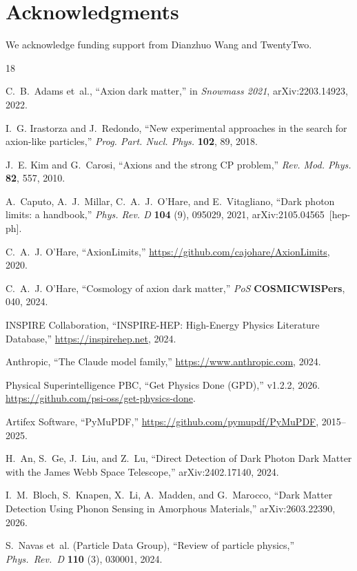 \documentclass{article}
\begin{document}
\section*{Acknowledgments}

We acknowledge funding support from Dianzhuo Wang and TwentyTwo.




\begin{thebibliography}{18}

C.~B.~Adams et~al.,
``Axion dark matter,''
in \textit{Snowmass 2021}, arXiv:2203.14923, 2022.

I.~G. Irastorza and J.~Redondo,
``New experimental approaches in the search for axion-like particles,''
\textit{Prog. Part. Nucl. Phys.} \textbf{102}, 89, 2018.

J.~E. Kim and G.~Carosi,
``Axions and the strong CP problem,''
\textit{Rev. Mod. Phys.} \textbf{82}, 557, 2010.

A.~Caputo, A.~J.~Millar, C.~A.~J.~O'Hare, and E.~Vitagliano,
``Dark photon limits: a handbook,''
\textit{Phys. Rev. D} \textbf{104} (9), 095029, 2021,
arXiv:2105.04565~[hep-ph].

C.~A.~J. O'Hare,
``AxionLimits,''
\url{https://github.com/cajohare/AxionLimits}, 2020.

C.~A.~J. O'Hare,
``Cosmology of axion dark matter,''
\textit{PoS} \textbf{COSMICWISPers}, 040, 2024.

INSPIRE Collaboration,
``INSPIRE-HEP: High-Energy Physics Literature Database,''
\url{https://inspirehep.net}, 2024.

Anthropic,
``The Claude model family,''
\url{https://www.anthropic.com}, 2024.

Physical Superintelligence PBC,
``Get Physics Done (GPD),'' v1.2.2, 2026.
\url{https://github.com/psi-oss/get-physics-done}.

Artifex Software,
``PyMuPDF,''
\url{https://github.com/pymupdf/PyMuPDF}, 2015--2025.

H.~An, S.~Ge, J.~Liu, and Z.~Lu,
``Direct Detection of Dark Photon Dark Matter with the James Webb Space Telescope,''
arXiv:2402.17140, 2024.

I.~M.~Bloch, S.~Knapen, X.~Li, A.~Madden, and G.~Marocco,
``Dark Matter Detection Using Phonon Sensing in Amorphous Materials,''
arXiv:2603.22390, 2026.

S.~Navas et~al. (Particle Data Group),
``Review of particle physics,''
\textit{Phys.\ Rev.\ D} \textbf{110} (3), 030001, 2024.

\end{thebibliography}
\end{document}
